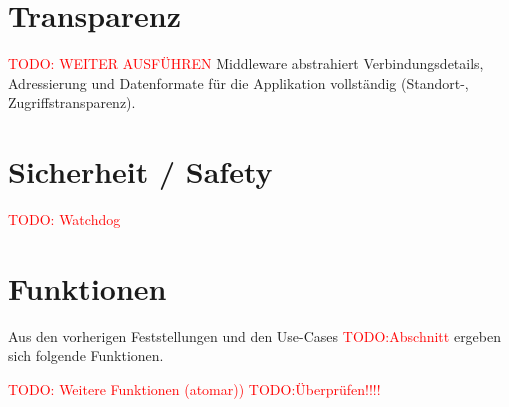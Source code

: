 
\section*{Transparenz}
\textcolor{red}{TODO: WEITER AUSFÜHREN}
Middleware abstrahiert Verbindungsdetails, Adressierung und Datenformate für die Applikation vollständig (Standort-, Zugriffstransparenz).

\section*{Sicherheit / Safety}

\textcolor{red}{TODO: Watchdog }
	

\section{Funktionen}
Aus den vorherigen Feststellungen und den Use-Cases \textcolor{red}{TODO:Abschnitt} ergeben sich folgende Funktionen.

\textcolor{red}{TODO: Weitere Funktionen (atomar))}
\textcolor{red}{TODO:Überprüfen!!!!}

